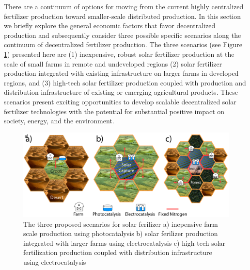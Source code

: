 There are a continuum of options for moving from the current highly centralized fertilizer production toward smaller-scale distributed production. In this section we briefly explore the general economic factors that favor decentralized production and subsequently consider three possible specific scenarios along the continuum of decentralized fertilizer production.
The three scenarios (see Figure \ref{fig:scenarios}) presented here are (1) inexpensive, robust solar fertilizer production at the scale of small farms in remote and undeveloped regions (2) solar fertilizer production integrated with existing infrastructure on larger farms in developed regions, and (3) high-tech solar fertilizer production coupled with production and distribution infrastructure of existing or emerging agricultural products. These scenarios present exciting opportunities to develop scalable decentralized solar fertilizer technologies with the potential for substantial positive impact on society, energy, and the environment.

\begin{figure}
    \centering
    \includegraphics[width=\textwidth]{Figures/solar_fertilizer_scenarios.pdf}
    \caption{The three proposed scenarios for solar ferilizer a) inepensive farm scale production using photocatalysis b) solar ferilizer production integrated with larger farms using electrocatalysis c) high-tech solar fertilization production coupled with distribution infrastructure using electrocatalysis}
    \label{fig:scenarios}
\end{figure}

